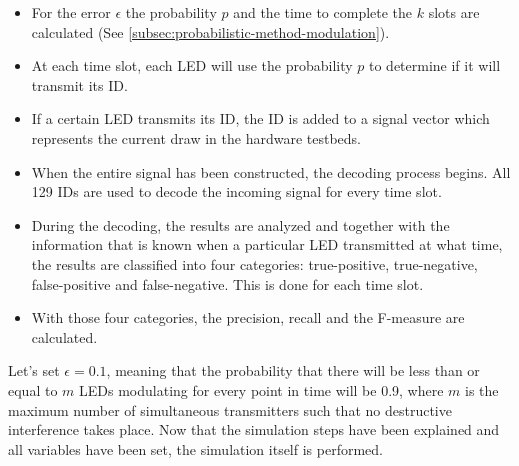 \begin{itemize}

	\item For the error $\epsilon$ the probability $p$ and the time to complete the $k$ slots are calculated (See \autoref{subsec:probabilistic-method-modulation}).

	\item At each time slot, each LED will use the probability $p$ to determine if it will transmit its ID.

	\item If a certain LED transmits its ID, the ID is added to a signal vector which represents the current draw in the hardware testbeds.

	\item When the entire signal has been constructed, the decoding process begins. All 129 IDs are used to decode the incoming signal for every time slot.

	\item During the decoding, the results are analyzed and together with the information that is known when a particular LED transmitted at what time, the results are classified into four categories: true-positive, true-negative, false-positive and false-negative. This is done for each time slot.

	\item With those four categories, the precision, recall and the F-measure are calculated.



\end{itemize}




Let's set $\epsilon = 0.1$, meaning that the probability that there will be less than or equal to $m$ LEDs modulating for every point in time will be 0.9, where $m$ is the maximum number of simultaneous transmitters such that no destructive interference takes place.
Now that the simulation steps have been explained and all variables have been set, the simulation itself is performed. 

